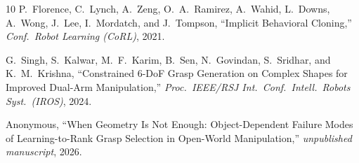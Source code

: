\documentclass[journal]{IEEEtran}
\begin{document}
\begin{thebibliography}{10}
P.~Florence, C.~Lynch, A.~Zeng, O.~A.~Ramirez, A.~Wahid, L.~Downs,
A.~Wong, J.~Lee, I.~Mordatch, and J.~Tompson,
``Implicit Behavioral Cloning,''
\emph{Conf.\ Robot Learning (CoRL)}, 2021.

G.~Singh, S.~Kalwar, M.~F.~Karim, B.~Sen, N.~Govindan, S.~Sridhar, and
K.~M.~Krishna,
``Constrained 6-DoF Grasp Generation on Complex Shapes for Improved
  Dual-Arm Manipulation,''
\emph{Proc.\ IEEE/RSJ Int.\ Conf.\ Intell.\ Robots Syst.\ (IROS)}, 2024.

Anonymous,
``When Geometry Is Not Enough: Object-Dependent Failure Modes of
  Learning-to-Rank Grasp Selection in Open-World Manipulation,''
\emph{unpublished manuscript}, 2026.

\end{thebibliography}
\end{document}
